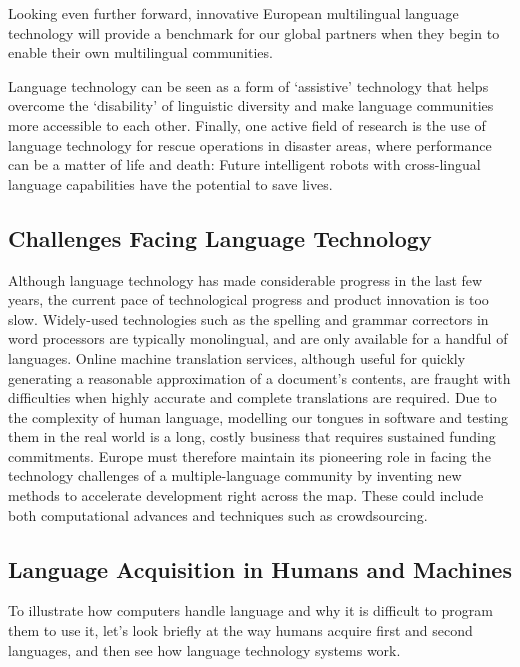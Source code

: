 \begin{multicols}{2}
Looking even further forward, innovative European multilingual language technology will provide a benchmark for our global partners when they begin to enable their own multilingual communities. 

Language technology can be seen as a form of ‘assistive’ technology that helps overcome the ‘disability’ of linguistic diversity and make language communities more accessible to each other.
Finally, one active field of research is the use of language technology for rescue operations in disaster areas, where performance can be a matter of life and death: Future intelligent robots with cross-lingual language capabilities have the potential to save lives.

\subsection{Challenges Facing Language Technology}

Although language technology has made considerable progress in the last few years, the current pace of technological progress and product innovation is too slow. Widely-used technologies such as the spelling and grammar correctors in word processors are typically monolingual, and are only available for a handful of languages. Online machine translation services, although useful for quickly generating a reasonable approximation of a document’s contents, are fraught with difficulties when highly accurate and complete translations are required. Due to the complexity of human language, modelling our tongues in software and testing them in the real world is a long, costly business that requires sustained funding commitments. Europe must therefore maintain its pioneering role in facing the technology challenges of a multiple-language community by inventing new methods to accelerate development right across the map. These could include both computational advances and techniques such as crowdsourcing.


\subsection{Language Acquisition in Humans and Machines}
To illustrate how computers handle language and why it is difficult to program them to use it, let’s look briefly at the way humans acquire first and second languages, and then see how language technology systems work. 


\end{multicols}
